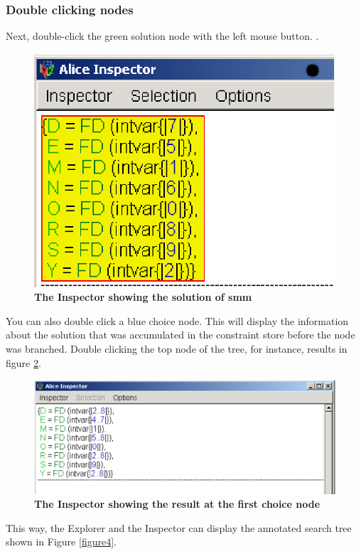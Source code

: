 \documentclass[a4paper]{scrartcl}
\begin{document}
\subsubsection{Double clicking nodes}
Next, double-click the green solution node with the left mouse button.
. 
\begin{figure}[htpb]
\centerline{\includegraphics*[scale=1.0]{figs/inspector1.eps}}
\caption{{\bf The Inspector showing the solution of smm}}
\label{figure7}
\end{figure}
You can also double click a blue choice node. 
This will display the information about the solution 
that was accumulated in the constraint store before the node was
branched. Double clicking the top node of the tree, for instance, 
results in figure \ref{figure8}.
\begin{figure}[htpb]
\centerline{\includegraphics*[scale=0.8]{figs/inspector2.eps}}
\caption{{\bf The Inspector showing the result at the first choice node}}
\label{figure8}
\end{figure}
This way, the Explorer and the Inspector can display the 
annotated search tree shown in Figure \ref{figure4}.\\
\end{document}
